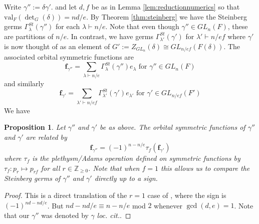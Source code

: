 \documentclass{amsart}
\numberwithin{equation}{section}
\newtheorem{proposition}[lemma]{Proposition}%
\theoremstyle{definition}
\def\val{\mathrm{val}}
\newcommand{\fgamma}{\mathbf{f}_{\gamma}}
\newcommand{\Z}{{\mathbb Z}}
\begin{document}
Write $\gamma'':=\delta\gamma'$. and let $d,f$ be as in Lemma \ref{lem:reductionnumerics} so that $\val_{F}(\det_G(\delta))=nd/e$. By Theorem \ref{thm:steinberg} we have the Steinberg germs $\Gamma_{\lambda}^{St}(\gamma'')$ for each $\lambda\vdash n/e$. Note that even though $\gamma''\in GL_n(F)$, these are partitions of $n/e$. In contrast, we have germs $\Gamma_{\lambda'}^{St}(\gamma')$ for $\lambda'\vdash n/ef$ where $\gamma'$ is now thought of as an element of $G':=Z_{GL_n}(\delta)\cong GL_{n/ef}(F(\delta))$. The associated orbital symmetric functions are
\[\mathbf{f}_{\gamma''}=\sum_{\lambda\vdash n/e}\Gamma_\lambda^{St}(\gamma'')e_\lambda\text{ for }\gamma''\in GL_n(F)\]
and similarly 
\[\mathbf{f}_{\gamma'}=\sum_{\lambda'\vdash n/ef}\Gamma_{\lambda'}^{St}(\gamma')e_{\lambda'}\text{ for }\gamma'\in GL_{n/ef}(F')\]
We have
\begin{proposition}
\label{prop:unramifiedextension}
Let $\gamma''$ and $\gamma'$ be as above. The orbital symmetric functions of $\gamma''$ and $\gamma'$ are related by
$$\mathbf{f}_{\gamma''}=(-1)^{n-n/e}\tau_f(\mathbf{f}_{\gamma'})$$
where $\tau_f$ is the plethysm/Adams operation defined on symmetric functions by $\tau_f: p_r\mapsto p_{rf}$ for all $r\in \Z_{\geq 0}$. Note that when $f=1$ this allows us to compare the Steinberg germs of $\gamma''$ and $\gamma'$ directly up to a sign.
\end{proposition}
\begin{proof}
This is a direct translation of the $r=1$ case of \cite[Proposition VII 2.]{W2}, where the sign is $(-1)^{nd-nd/e}$. But $nd-nd/e\equiv n-n/e $ mod $2$ whenever $\gcd(d,e)=1$. Note that our $\gamma''$ was denoted by $\gamma$ {\it loc. cit.}.
\end{proof}
 
\end{document}
